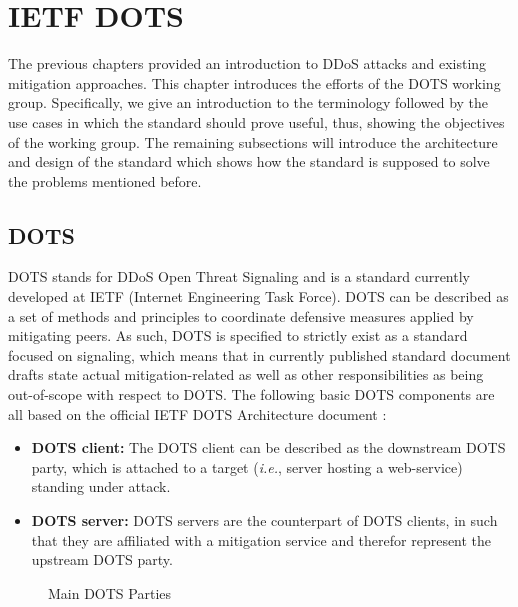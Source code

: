 \section{IETF DOTS}
The previous chapters provided an introduction to DDoS attacks and existing mitigation approaches. This chapter introduces the efforts of the DOTS working group. Specifically, we give an introduction to the terminology followed by the use cases in which the standard should prove useful, thus, showing the objectives of the working group. The remaining subsections will introduce the architecture and design of the standard which shows how the standard is supposed to solve the problems mentioned before.

\subsection{DOTS}

DOTS stands for DDoS Open Threat Signaling and is a standard currently developed at IETF (Internet Engineering Task Force). DOTS can be described as a set of methods and principles to coordinate defensive measures applied by mitigating peers. As such, DOTS is specified to strictly exist as a standard focused on signaling, which means that in currently published standard document drafts state actual mitigation-related as well as other responsibilities as being out-of-scope with respect to DOTS. The following basic DOTS components are all based on the official IETF DOTS Architecture document \cite{dots-architecture}:

\begin{itemize}
    \item \textbf{DOTS client:} The DOTS client can be described as the downstream DOTS party, which is attached to a target (\emph{i.e.}, server hosting a web-service) standing under attack.
    \item \textbf{DOTS server:} DOTS servers are the counterpart of DOTS clients, in such that they are affiliated with a mitigation service and therefor represent the upstream DOTS party.
\end{itemize}

\begin{figure}[H]
\label{fig:DOTSarchitecture}
\centering
\caption{Main DOTS Parties \cite{dots-architecture}}
\end{figure}

